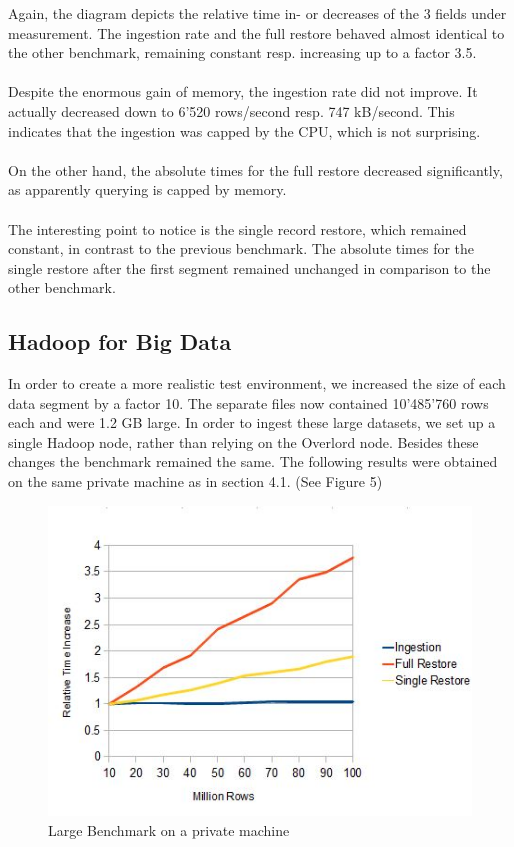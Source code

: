 \documentclass[11pt,singlecolumn]{scrartcl}
\begin{document}
Again, the diagram depicts the relative time in- or decreases of the 3 fields under measurement. The ingestion rate and the full restore behaved almost identical to the other benchmark, remaining constant resp. increasing up to a factor 3.5.\\\\Despite the enormous gain of memory, the ingestion rate did not improve. It actually decreased down to 6'520 rows/second resp. 747 kB/second. This indicates that the ingestion was capped by the CPU, which is not surprising.\\\\On the other hand, the absolute times for the full restore decreased significantly, as apparently querying is capped by memory.\\\\
The interesting point to notice is the single record restore, which remained constant, in contrast to the previous benchmark. The absolute times for the single restore after the first segment remained unchanged in comparison to the other benchmark.


\clearpage
\subsection{Hadoop for Big Data}
In order to create a more realistic test environment, we increased the size of each data segment by a factor 10. The separate files now contained 10'485'760 rows each and were 1.2 GB large. In order to ingest these large datasets, we set up a single Hadoop node, rather than relying on the Overlord node. Besides these changes the benchmark remained the same. The following results were obtained on the same private machine as in section 4.1. (See Figure 5) 

\begin{figure}[h]
\includegraphics[scale=1.1]{100m.jpg}
\caption{Large Benchmark on a private machine}
\end{figure}
\end{document}

